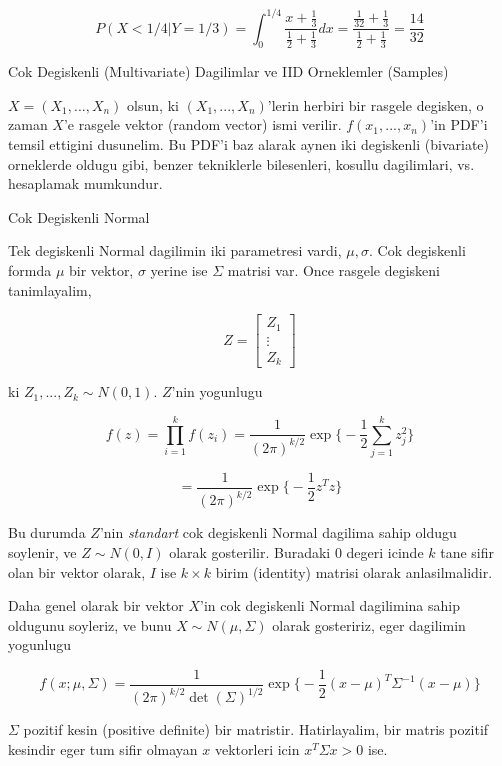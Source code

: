 \documentclass[12pt,fleqn]{article}\usepackage{../common}
\begin{document}
\[ P(X < 1/4 | Y = 1/3) = 
\int _{ 0}^{1/4} \frac{ x+ \frac{ 1}{3} }{\frac{ 1}{2} + \frac{1 }{3}} dx = 
\frac{ \frac{ 1}{32}+ \frac{ 1}{3} }{\frac{ 1}{2} + \frac{1 }{3}} = 
\frac{ 14}{32}
\]

Cok Degiskenli (Multivariate) Dagilimlar ve IID Orneklemler (Samples)

$X = (X_1,...,X_n)$ olsun, ki $(X_1,...,X_n)$'lerin herbiri bir rasgele
degisken, o zaman $X$'e rasgele vektor (random vector) ismi
verilir. $f(x_1,...,x_n)$'in PDF'i temsil ettigini dusunelim. Bu PDF'i baz
alarak aynen iki degiskenli (bivariate) orneklerde oldugu gibi, benzer
tekniklerle bilesenleri, kosullu dagilimlari, vs. hesaplamak mumkundur.

Cok Degiskenli Normal 

Tek degiskenli Normal dagilimin iki parametresi vardi, $\mu,\sigma$. Cok
degiskenli formda $\mu$ bir vektor, $\sigma$ yerine ise $\Sigma$ matrisi
var. Once rasgele degiskeni tanimlayalim,

\[ Z = 
\left[\begin{array}{r}
Z_1 \\ \vdots \\ Z_k
\end{array}\right]
 \]

ki $Z_1,...,Z_k \sim N(0,1)$. $Z$'nin yogunlugu 

\[ f(z) = \prod _{ i=1}^{k}f(z_i) = 
\frac{ 1}{(2\pi)^{k/2}} \exp 
\bigg\{ 
-\frac{ 1}{2}\sum _{ j=1}^{k}z_j^2
\bigg\}
 \]

\[ =
\frac{ 1}{(2\pi)^{k/2}} \exp 
\bigg\{ 
-\frac{ 1}{2}z^Tz
\bigg\}
 \]


Bu durumda $Z$'nin {\em standart} cok degiskenli Normal dagilima sahip
oldugu soylenir, ve $Z \sim N(0,I)$ olarak gosterilir. Buradaki $0$
degeri icinde $k$ tane sifir olan bir vektor olarak, $I$ ise $k \times k$
birim (identity) matrisi olarak anlasilmalidir. 

Daha genel olarak bir vektor $X$'in cok degiskenli Normal dagilimina sahip
oldugunu soyleriz, ve bunu $X \sim N(\mu,\Sigma)$ olarak gosteririz, eger
dagilimin yogunlugu 

\[ f(x;\mu,\Sigma) = 
\frac{ 1}{(2\pi)^{k/2} \det(\Sigma)^{1/2}} \exp 
\bigg\{ 
-\frac{ 1}{2}(x-\mu)^T\Sigma^{-1}(x-\mu)
\bigg\}
 \]

$\Sigma$ pozitif kesin (positive definite) bir matristir. Hatirlayalim, bir matris
pozitif kesindir eger tum sifir olmayan $x$ vektorleri icin $x^T\Sigma x >
0$ ise. 
\end{document}
